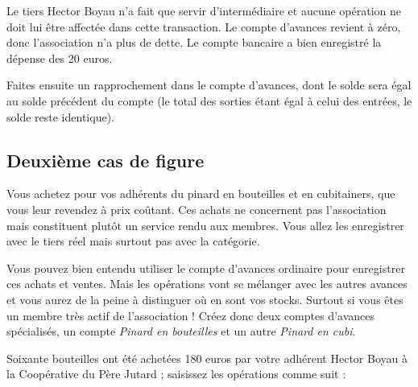 Le tiers Hector Boyau n'a fait que servir d'intermédiaire et aucune opération ne 
doit lui être affectée dans cette transaction. Le compte d'avances revient à zéro, donc l'association n'a plus de dette. Le compte bancaire a bien enregistré la dépense des 20 euros.

Faites ensuite un rapprochement dans le compte d'avances, dont le solde sera égal au solde précédent du compte (le total des sorties étant égal à celui des entrées, le solde reste identique). 


\subsection{Deuxième cas de figure\label{asso-simple-secondCase} }

Vous achetez pour vos adhérents du pinard en bouteilles et en cubitainers, que vous leur revendez à prix coûtant. Ces achats ne concernent pas l'association mais constituent plutôt un service rendu aux membres. Vous allez les enregistrer avec le tiers réel mais surtout pas avec la catégorie. 

Vous pouvez bien entendu utiliser le compte d'avances ordinaire pour enregistrer ces achats et ventes. Mais les opérations vont se mélanger avec les autres avances et vous aurez de la peine à distinguer où en sont vos stocks. Surtout si vous êtes un membre très actif de l'association ! Créez donc deux comptes d'avances spécialisés, un compte \emph{Pinard en bouteilles} et un autre \emph{Pinard en cubi}.

Soixante bouteilles ont été achetées 180 euros par votre adhérent Hector Boyau à la Coopérative du Père Jutard ; saisissez les opérations comme suit : 

